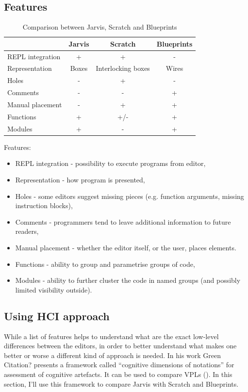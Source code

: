 \documentclass[11pt]{scrartcl}
\begin{document}
\subsection{Features}
\begin{table}[hbt]
  \begin{tabular}{l|ccc}
    & Jarvis & Scratch & Blueprints \\
    \hline
    REPL integration & + & + & - \\
    Representation & Boxes & Interlocking boxes & Wires \\
    Holes & - & + & - \\
    Comments & - & - & + \\
    Manual placement & - & + & + \\
    Functions & + & +/- & + \\
    Modules & + & - & + \\
  \end{tabular}
  \caption{Comparison between Jarvis, Scratch and Blueprints}
\end{table}
Features:
\begin{itemize}
\item REPL integration - possibility to execute programs from editor,
  \item Representation - how program is presented,
  \item Holes - some editors suggest missing pieces (e.g. function arguments,
    missing instruction blocks),
  \item Comments - programmers tend to leave additional information to future
    readers,
    
  \item Manual placement - whether the editor itself, or the user, places
    elements.
    
  \item Functions - ability to group and parametrise groups of code,
    
  \item Modules - ability to further cluster the code in named groups (and
    possibly limited visibility outside).
    
\end{itemize}
\subsection{Using HCI approach}
While a list of features helps to understand what are the exact low-level
differences between the editors, in order to better understand what makes one
better or worse a different kind of approach is needed.
In his work Green {Citation?} presents a framework called “cognitive dimensions
of notations” for assessment of cognitive artefacts.
It can be used to compare VPLs (\cite{Green96UsabilityAnalysis}). In this section,
I’ll use this framework to compare Jarvis with Scratch and Blueprints.
\end{document}
